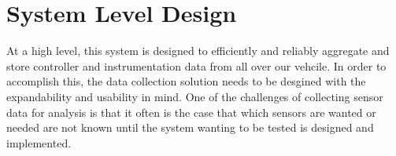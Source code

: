 \section{System Level Design}

At a high level, this system is designed to efficiently and reliably aggregate and store controller and instrumentation data from all over our vehcile.
In order to accomplish this, the data collection solution needs to be desgined with the expandability and usability in mind.
One of the challenges of collecting sensor data for analysis is that it often is the case that which sensors are wanted or needed are not known until the system wanting to be tested is designed and implemented.
